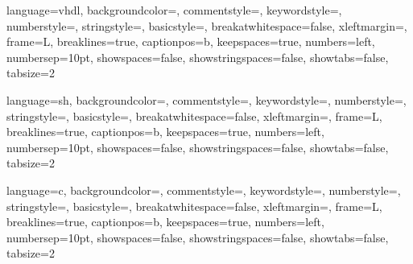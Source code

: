 \usepackage{listings}
\usepackage{color}


\renewcommand{\lstlistingname}{Code}

	{
    language=vhdl,
    backgroundcolor=\color{backcolour},
    commentstyle=\color{lightgray},
    keywordstyle=\color{purple},
    numberstyle=\tiny\color{gray},
    stringstyle=\color{blue},
    basicstyle=\footnotesize,
    breakatwhitespace=false,
    xleftmargin=\parindent,
    frame=L,
    breaklines=true,
    captionpos=b,
    keepspaces=true,
    numbers=left,
    numbersep=10pt,
    showspaces=false,
    showstringspaces=false,
    showtabs=false,
    tabsize=2
}

	{
    language=sh,
    backgroundcolor=\color{backcolour},
    commentstyle=\color{lightgray},
    keywordstyle=\color{amethyst},
    numberstyle=\small\color{gray},
    stringstyle=\color{blue},
    basicstyle=\footnotesize,
    breakatwhitespace=false,
    xleftmargin=\parindent,
    frame=L,
    breaklines=true,
    captionpos=b,
    keepspaces=true,
    numbers=left,
    numbersep=10pt,
    showspaces=false,
    showstringspaces=false,
    showtabs=false,
    tabsize=2
}

	{
    language=c,
    backgroundcolor=\color{backcolour},
    commentstyle=\color{lightgray},
    keywordstyle=\color{amethyst},
    numberstyle=\small\color{gray},
    stringstyle=\color{blue},
    basicstyle=\footnotesize,
    breakatwhitespace=false,
    xleftmargin=\parindent,
    frame=L,
    breaklines=true,
    captionpos=b,
    keepspaces=true,
    numbers=left,
    numbersep=10pt,
    showspaces=false,
    showstringspaces=false,
    showtabs=false,
    tabsize=2
}
